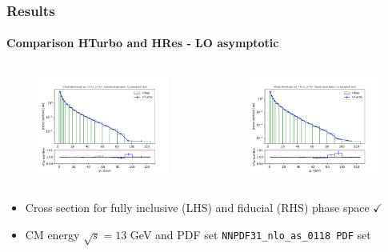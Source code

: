 \documentclass[aspectratio=43]{beamer}
\begin{document}
\begin{frame}
	
	\frametitle{Results}
	\framesubtitle{Comparison HTurbo and HRes - LO asymptotic}
	
	\footnotesize
	
	\begin{columns}
		
		
		\begin{figure}
			\includegraphics[width = 7cm]{plots/part3/chapter6/nlo-ct-1.png}
		\end{figure}
		
		
		\begin{figure}
			\includegraphics[width = 7cm]{plots/part3/chapter6/nlo-ct-fid-1.png}
		\end{figure}
		
	\end{columns}
	
	\begin{itemize}
		\item Cross section for fully inclusive (LHS) and fiducial (RHS) phase space {\color{darkgreen}$\checkmark$} 
		\item CM energy $\sqrt s = 13$ GeV and PDF set \texttt{NNPDF31\_nlo\_as\_0118 PDF} set
	\end{itemize}

\end{frame}
\end{document}
